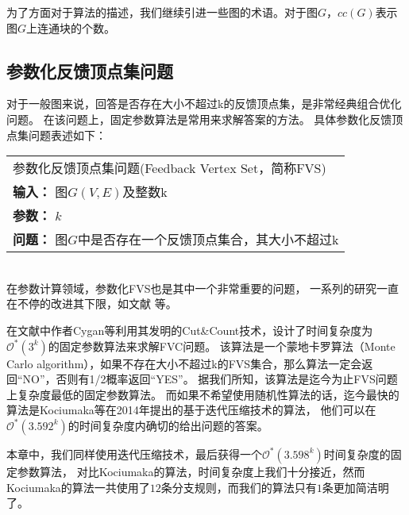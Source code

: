 为了方面对于算法的描述，我们继续引进一些图的术语。对于图$G$，$cc(G)$表示图$G$上连通块的个数。

\subsection{参数化反馈顶点集问题}
对于一般图来说，回答是否存在大小不超过k的反馈顶点集，是非常经典组合优化问题。
在该问题上，固定参数算法是常用来求解答案的方法。
具体参数化反馈顶点集问题表述如下：\\

\begin{tabular}{| p{0.9\headwidth} |}
  \hline
  参数化反馈顶点集问题(Feedback Vertex Set，简称FVS) \\
  \textbf{输入：} 图$G(V, E)$及整数k \\
  \textbf{参数：} $k$\\
  \textbf{问题：} 图$G$中是否存在一个反馈顶点集合，其大小不超过k\\
  \hline
\end{tabular} \vspace{0.5cm} \\

在参数计算领域，参数化FVS也是其中一个非常重要的问题，
一系列的研究一直在不停的改进其下限，如文献\cite{bodlaender1994disjoint,downey1992fixed,downey2012parameterized,raman2006faster,kanj2004parameterized,dehne20072o,guo2006compression,chen2008improved,cao2010feedback,cygan2011solving,kociumaka2014faster} 等。

在文献\cite{cygan2011solving}中作者Cygan等利用其发明的Cut\&Count技术，设计了时间复杂度为$\mathcal{O}^*(3^k)$的固定参数算法来求解FVC问题。
该算法是一个蒙地卡罗算法（Monte Carlo algorithm），如果不存在大小不超过k的FVS集合，那么算法一定会返回“NO”，否则有1/2概率返回“YES”。
据我们所知，该算法是迄今为止FVS问题上复杂度最低的固定参数算法。
而如果不希望使用随机性算法的话，迄今最快的算法是Kociumaka等在2014年提出的基于迭代压缩技术的算法，
他们可以在$\mathcal{O}^*(3.592^k)$的时间复杂度内确切的给出问题的答案。

本章中，我们同样使用迭代压缩技术，最后获得一个$\mathcal{O}^*(3.598^k)$时间复杂度的固定参数算法，
对比Kociumaka的算法，时间复杂度上我们十分接近，然而Kociumaka的算法一共使用了$12$条分支规则，而我们的算法只有$1$条更加简洁明了。

